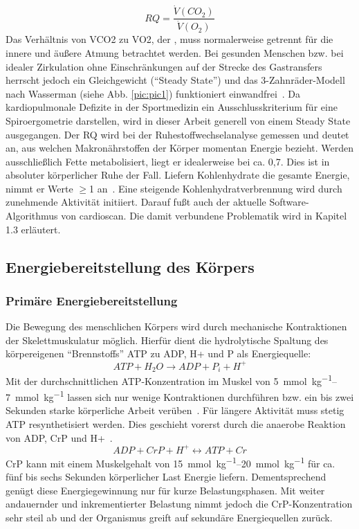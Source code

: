 %
\begin{equation}
RQ = \frac{\dot{V}(CO_2)}{\dot{V}(O_2)}
\label{eq:formel1}
\end{equation}
%
Das Verhältnis von \acrfull{VCO2} zu \acrfull{VO2}, der , muss normalerweise getrennt für die innere und äußere Atmung betrachtet werden. Bei gesunden Menschen bzw. bei idealer Zirkulation ohne Einschränkungen auf der Strecke des Gastransfers herrscht jedoch ein Gleichgewicht ("`Steady State"') und das 3-Zahnräder-Modell nach Wasserman (siehe Abb. \ref{pic:pic1}) funktioniert einwandfrei~\cite{Kroidl.2015}. Da kardiopulmonale Defizite in der Sportmedizin ein Ausschlusskriterium für eine Spiroergometrie darstellen, wird in dieser Arbeit generell von einem Steady State ausgegangen. Der RQ wird bei der Ruhestoffwechselanalyse gemessen und deutet an, aus welchen Makronährstoffen der Körper momentan Energie bezieht. Werden ausschließlich Fette metabolisiert, liegt er idealerweise bei ca. 0,7. Dies ist in absoluter körperlicher Ruhe der Fall. Liefern Kohlenhydrate die gesamte Energie, nimmt er Werte $\geq$1 an~\cite{Kroidl.2015}. Eine steigende Kohlenhydratverbrennung wird durch zunehmende Aktivität initiiert. Darauf fußt auch der aktuelle Software-Algorithmus von cardioscan. Die damit verbundene Problematik wird in Kapitel 1.3 erläutert.
%
\subsection{Energiebereitstellung des Körpers}
%
\subsubsection{Primäre Energiebereitstellung}
%
Die Bewegung des menschlichen Körpers wird durch mechanische Kontraktionen der Skelettmuskulatur möglich. Hierfür dient die hydrolytische Spaltung des körpereigenen "`Brennstoffs"' \gls{ATP} zu \gls{ADP}, \gls{H+} und \gls{P} als Energiequelle:
%
\begin{equation}
ATP + H_2O \rightarrow ADP + P_i + H^+
\label{eq:formel2}
\end{equation}
%
Mit der durchschnittlichen \gls{ATP}-Konzentration im Muskel von \SIrange{5}{7}{\milli\mole\per\kg} lassen sich nur wenige Kontraktionen durchführen bzw. ein bis zwei Sekunden starke körperliche Arbeit verüben~\cite{DeMarees.1981}. Für längere Aktivität muss stetig \gls{ATP} resynthetisiert werden. Dies geschieht vorerst durch die anaerobe Reaktion von \gls{ADP}, \gls{CrP} und \gls{H+}~\cite{Heck.2006}.
%
\begin{equation}
ADP + CrP + H^+ \leftrightarrow ATP + Cr
\label{eq:formel3}
\end{equation}
%
\gls{CrP} kann mit einem Muskelgehalt von \SIrange{15}{20}{\milli\mole\per\kg} für ca. fünf bis sechs Sekunden körperlicher Last Energie liefern. Dementsprechend genügt diese Energiegewinnung nur für kurze Belastungsphasen. Mit weiter andauernder und inkrementierter Belastung nimmt jedoch die \gls{CrP}-Konzentration sehr steil ab und der Organismus greift auf sekundäre Energiequellen zurück.
\clearpage
